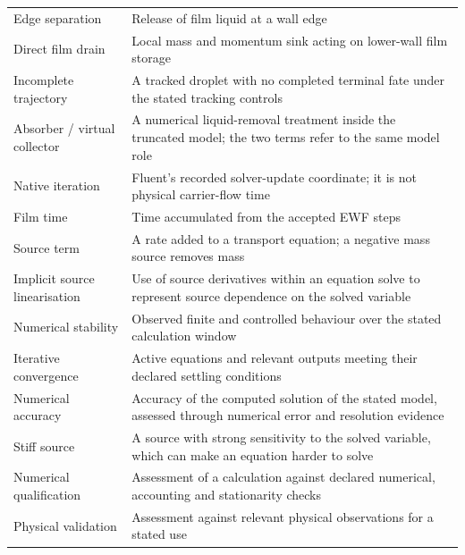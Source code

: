 \documentclass[12pt]{article}
\begin{document}
{\begin{longtable}[]{@{}
  >{\raggedright\arraybackslash}p{}
  >{\raggedright\arraybackslash}p{}@{}}
Edge separation & Release of film liquid at a wall edge \\
Direct film drain & Local mass and momentum sink acting on lower-wall film storage \\
Incomplete trajectory & A tracked droplet with no completed terminal fate under the stated tracking controls \\
Absorber / virtual collector & A numerical liquid-removal treatment inside the truncated model; the two terms refer to the same model role \\
Native iteration & Fluent's recorded solver-update coordinate; it is not physical carrier-flow time \\
Film time & Time accumulated from the accepted EWF steps \\
Source term & A rate added to a transport equation; a negative mass source removes mass \\
Implicit source linearisation & Use of source derivatives within an equation solve to represent source dependence on the solved variable \\
Numerical stability & Observed finite and controlled behaviour over the stated calculation window \\
Iterative convergence & Active equations and relevant outputs meeting their declared settling conditions \\
Numerical accuracy & Accuracy of the computed solution of the stated model, assessed through numerical error and resolution evidence \\
Stiff source & A source with strong sensitivity to the solved variable, which can make an equation harder to solve \\
Numerical qualification & Assessment of a calculation against declared numerical, accounting and stationarity checks \\
Physical validation & Assessment against relevant physical observations for a stated use \\
\end{longtable}
}
\endgroup

\bigskip
\end{document}
